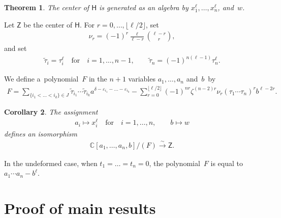 \documentclass[pdftex]{sigma}
\numberwithin{equation}{section}
\newtheorem{Theorem}{Theorem}[section]
\newtheorem{Corollary}[Theorem]{Corollary}
\begin{document}
\begin{Theorem}
\label{T2}
The center of $\mathsf{H}$ is generated as an algebra by $x_1^\ell, \ldots, x_n^\ell$, and~$w$.
\end{Theorem}

Let $\mathsf{Z}$ be the center of $\mathsf{H}$.
For $ r=0,\ldots, \lfloor \ell/2\rfloor$, set
\begin{gather*}
\nu_r = (-1)^r \frac{\ell}{\ell-r} \binom{\ell-r}{r},
\end{gather*}
and set
\begin{gather*}
{\widetilde{\tau}}_i = \tau_i^\ell
\quad \text{for} \quad
i=1, \ldots, n-1,
\qquad
{\widetilde{\tau}}_n = (-1)^{n(\ell-1)}\tau_n^\ell.
\end{gather*}

We def\/ine a~polynomial~$F$ in the $n+1$ variables $a_1, \ldots, a_n$ and~$b$~by
\begin{gather}
\label{relation}
F = \sum\limits_{\{i_1<\dots<i_k\}\in J} {\widetilde{\tau}}_{i_1}\cdots {\widetilde{\tau}}_{i_k}
a^{\delta-\varepsilon_{i_1} - \dots - \varepsilon_{i_k}} - \sum\limits_{r=0}^{\lfloor \ell/2 \rfloor} (-1)^{nr}
\zeta^{(n-2)r} \nu_r (\tau_1\cdots \tau_n)^r b^{\ell-2r}.
\end{gather}

\begin{Corollary}
\label{maincor}
The assignment
\begin{gather}
\label{mapphi}
a_i\mapsto x_i^\ell
\quad \text{for} \quad
i=1, \ldots, n,
\qquad
b \mapsto w
\end{gather}
defines an isomorphism
\begin{gather}
\label{center}
{\mathbb{C}}[a_1,\ldots, a_n,b]/(F) \stackrel{\sim}{\longrightarrow} \mathsf{Z}.
\end{gather}
\end{Corollary}

In the undeformed case, when $t_1=\dots=t_n=0$, the polynomial~$F$ is equal to $a_1\cdots a_n - b^\ell$.


\section{Proof of main results}\label{Section2}
\end{document}
